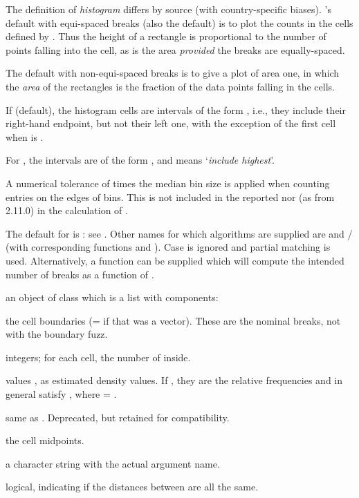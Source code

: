 \begin{Details}\relax
The definition of \emph{histogram} differs by source (with
country-specific biases).  \R{}'s default with equi-spaced breaks (also
the default) is to plot the counts in the cells defined by
.  Thus the height of a rectangle is proportional to
the number of points falling into the cell, as is the area
\emph{provided} the breaks are equally-spaced.

The default with non-equi-spaced breaks is to give
a plot of area one, in which the \emph{area} of the rectangles is the
fraction of the data points falling in the cells.

If  (default), the histogram cells are intervals
of the form \code{(a, b]}, i.e., they include their right-hand endpoint,
but not their left one, with the exception of the first cell when
 is .

For , the intervals are of the form \code{[a, b)},
and  means `\emph{include highest}'.

A numerical tolerance of  times the median bin size
is applied when counting entries on the edges of bins.  This is not
included in the reported  nor (as from \R{} 2.11.0) in the
calculation of .

The default for  is : see
.  Other names for which algorithms
are supplied are  and  /
 (with corresponding functions
 and ).
Case is ignored and partial matching is used.
Alternatively, a function can be supplied which
will compute the intended number of breaks as a function of .
\end{Details}
%
\begin{Value}
an object of class  which is a list with components:
\begin{ldescription}
\item[\code{breaks}] the  cell boundaries (=  if that
was a vector). These are the nominal breaks, not with the boundary fuzz.
\item[\code{counts}]  integers; for each cell, the number of
 inside.
\item[\code{density}] values , as estimated
density values. If , they are the
relative frequencies  and in general satisfy
, where  = .
\item[\code{intensities}] same as . Deprecated, but retained
for compatibility.
\item[\code{mids}] the  cell midpoints.
\item[\code{xname}] a character string with the actual  argument name.
\item[\code{equidist}] logical, indicating if the distances between
 are all the same.
\end{ldescription}
\end{Value}
